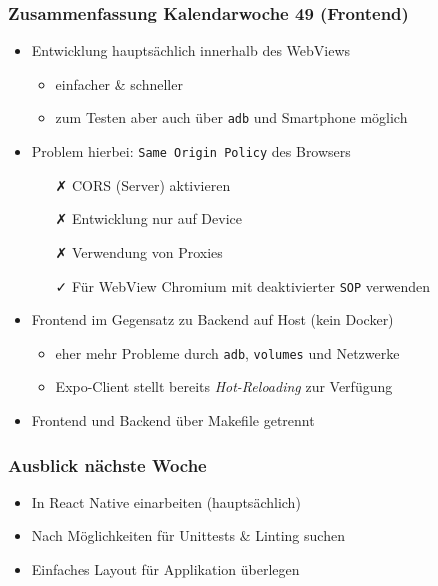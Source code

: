 \documentclass{beamer}
\newcommand{\cw}{49}
\begin{document}
  \begin{frame}
    \frametitle{Zusammenfassung Kalendarwoche \cw{} (Frontend)}
    \begin{itemize}
      \item Entwicklung hauptsächlich innerhalb des WebViews
      \begin{itemize}
        \item einfacher \& schneller
        \item zum Testen aber auch über \texttt{adb} und Smartphone möglich
      \end{itemize}
      \item Problem hierbei: \texttt{Same Origin Policy} des Browsers
      \begin{itemize}
        \item[\tiny\faClose] CORS (Server) aktivieren
        \item[\tiny\faClose] Entwicklung nur auf Device
        \item[\tiny\faClose] Verwendung von Proxies
        \item[\tiny\faCheck] Für WebView Chromium mit deaktivierter \texttt{SOP}
                          verwenden 
      \end{itemize}
      \item Frontend im Gegensatz zu Backend auf Host (kein Docker)
      \begin{itemize}
        \item eher mehr Probleme durch \texttt{adb}, \texttt{volumes} und
                Netzwerke
        \item Expo-Client stellt bereits \textit{Hot-Reloading} zur Verfügung
      \end{itemize}
      \item Frontend und Backend über Makefile getrennt
    \end{itemize}
  \end{frame}

  \begin{frame}
    \frametitle{Ausblick nächste Woche}
    \begin{itemize}
      \item In React Native einarbeiten (hauptsächlich)
      \item Nach Möglichkeiten für Unittests \& Linting suchen
      \item Einfaches Layout für Applikation überlegen
    \end{itemize}
  \end{frame}
\end{document}

